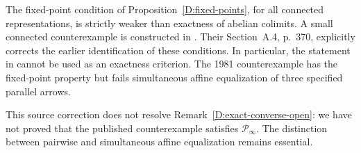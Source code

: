 \begin{remark}\label{D:fpp-not-exact}
The fixed-point condition of Proposition~\ref{D:fixed-points}, for all
connected representations, is strictly weaker than exactness of
abelian colimits. A small connected counterexample is constructed in
\citet[Part~C, Construction~C.1 and Theorem~C.2, pp.~384--389]{AdamekKoubekReiterman1981Embeddings}.
Their Section~A.4, p.~370, explicitly corrects the earlier identification
of these conditions. In particular, the statement in
\citet[Section~II.3, p.~100]{AdamekReiterman1976SetColim} cannot be used as
an exactness criterion. The 1981 counterexample has the fixed-point
property but fails simultaneous affine equalization of three specified
parallel arrows.

This source correction does not resolve Remark~\ref{D:exact-converse-open}:
we have not proved that the published counterexample satisfies
$\mathcal P_\infty$. The distinction between pairwise and simultaneous
affine equalization remains essential.
\end{remark}
